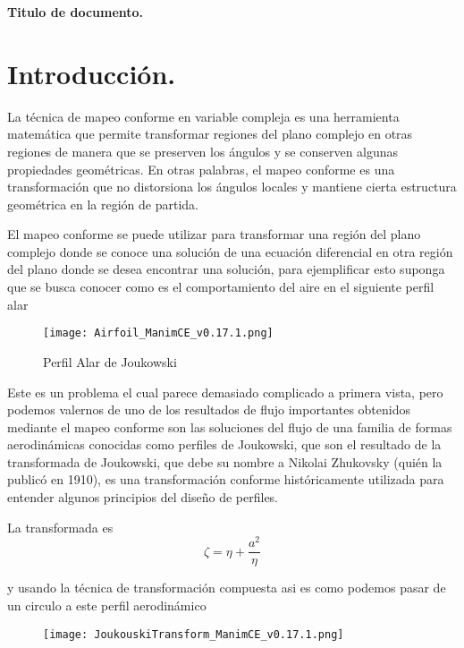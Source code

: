 \documentclass[12pt]{article}
\begin{document}
\newpage
\begin{center}
    \textbf{\Large Titulo de documento.}
    \end{center}

\section*{Introducción.}
	\noindent La técnica de mapeo conforme en variable compleja es una herramienta matemática que permite transformar regiones del plano complejo en otras regiones de manera que se preserven los ángulos y se conserven algunas propiedades geométricas. En otras palabras, el mapeo conforme es una transformación que no distorsiona los ángulos locales y mantiene cierta estructura geométrica en la región de partida.

	El mapeo conforme se puede utilizar para transformar una región del plano complejo donde se conoce una solución de una ecuación diferencial en otra región del plano donde se desea encontrar una solución, para ejemplificar esto suponga que se busca conocer como es el comportamiento del aire en el siguiente perfil alar

	\begin{figure}[!h]
		\begin{small}
			\begin{center}
				\texttt{[image: Airfoil\_ManimCE\_v0.17.1.png]}
			\end{center}
			\caption{Perfil Alar de Joukowski}
		\end{small}
	\end{figure}
	
	\noindent Este es un problema el cual parece demasiado complicado a primera vista, pero podemos valernos de uno de los resultados de flujo importantes obtenidos mediante el mapeo conforme son las soluciones del flujo de una familia de formas aerodinámicas conocidas como perfiles de Joukowski, que son el resultado de  la transformada de Joukowski, que debe su nombre a Nikolai Zhukovsky (quién la publicó en 1910), es una transformación conforme históricamente utilizada para entender algunos principios del diseño de perfiles.
	
	La transformada es
	\begin{equation}
		\zeta = \eta + \frac{a^2}{\eta}	
	\end{equation}
	
	\noindent y usando la técnica de transformación compuesta asi es como podemos pasar de un circulo a este perfil aerodinámico
	\begin{figure}[!h]
		\begin{small}
			\begin{center}
				\texttt{[image: JoukouskiTransform\_ManimCE\_v0.17.1.png]}
			\end{center}
			\caption{}
			\label{TransformacionCompuesta}
		\end{small}
	\end{figure}
	
\end{document}

